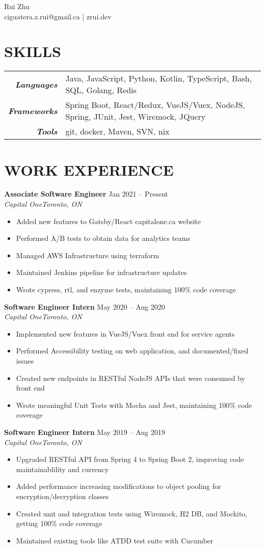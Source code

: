 \documentclass[letterpaper]{article}
\newcommand{\Header}[2]{\begin{center}
	\Huge\usefont{OT1}{lmss}{m}{n}
		#1 \\
	\small #2 \\
	\normalsize \normalfont
\end{center}}
\newcommand{\SplitEntry}[2]{\textbf{\textit{#1}} & #2\\}
\newcommand{\NewPart}[1]{\section*{\uppercase{\textbf{#1}}}}
\newcommand{\DatedEntry}[5]{\large\textbf{#1}
	\hfill #2\\\normalsize
	\textit{#3}\hfill\textit{#4}\\\vspace{0.10cm}
	#5
}
\begin{document}
\Header{Rui Zhu}{ciguatera.z.rui@gmail.ca $|$ zrui.dev}

\NewPart{Skills}{}
\begin{tabular}{r|l}
	\SplitEntry{Languages}{Java, JavaScript, Python, Kotlin, TypeScript, Bash, SQL, Golang, Redis}
	\SplitEntry{Frameworks}{Spring Boot, React/Redux, VueJS/Vuex, NodeJS, Spring, JUnit, Jest, Wiremock, JQuery}
	\SplitEntry{Tools}{git, docker, Maven, SVN, nix}
\end{tabular}

\NewPart{Work Experience}{}
\DatedEntry{Associate Software Engineer}
{Jan 2021 -- Present}
{Capital One}
{Toronto, ON}
{\begin{itemize}[nolistsep]
	\item Added new features to Gatsby/React capitalone.ca website
	\item Performed A/B tests to obtain data for analytics teams
	\item Managed AWS Infrastructure using terraform
	\item Maintained Jenkins pipeline for infrastructure updates
	\item Wrote cypress, rtl, and enzyme tests, maintaining 100\% code coverage
\end{itemize}}
\DatedEntry{Software Engineer Intern}
{May 2020 -- Aug 2020}
{Capital One}
{Toronto, ON}
{\begin{itemize}[nolistsep]
	\item Implemented new features in VueJS/Vuex front end for service agents 
	\item Performed Accessibility testing on web application, and documented/fixed issues
	\item Created new endpoints in RESTful NodeJS APIs that were consumed by front end
	\item Wrote meaningful Unit Tests with Mocha and Jest, maintaining 100\% code coverage
\end{itemize}}
\DatedEntry{Software Engineer Intern}
{May 2019 -- Aug 2019}
{Capital One}
{Toronto, ON}
{\begin{itemize}[nolistsep]
	\item Upgraded RESTful API from Spring 4 to Spring Boot 2, improving code maintainablility and currency
	\item Added performance increasing modifications to object pooling for encryption/decryption classes
	\item Created unit and integration tests using Wiremock, H2 DB, and Mockito, getting 100\% code coverage
	\item Maintained existing tools like ATDD test suite with Cucumber
\end{itemize}}
\end{document}
